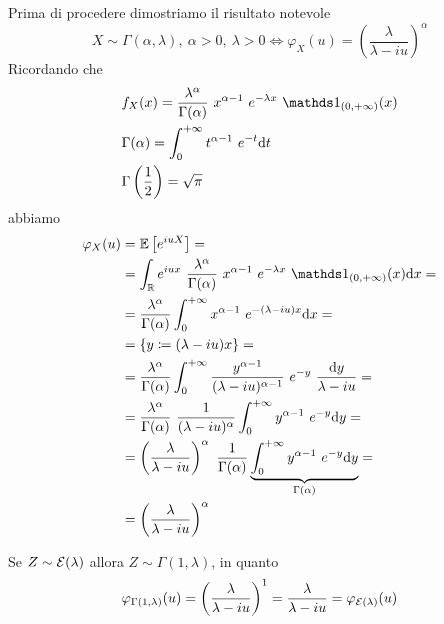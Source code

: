 \Soluzione{} %
Prima di procedere dimostriamo il risultato notevole
\[
X\sim\Gamma(\alpha,\lambda),\ \alpha>0,\ \lambda>0\iff\varphi_X(u)=\left(\frac{\lambda}{\lambda-iu} \right)^\alpha
\]
Ricordando che
\begin{gather*}
\begin{aligned}
&f_X(x)=\frac{\lambda^\alpha}{\Gamma(\alpha)}\ x^{\alpha-1}\ e^{-\lambda x}\ \Ind_{(0,+\infty)}(x) \\
&\Gamma(\alpha)=\int_{0}^{+\infty} t^{\alpha-1}\ e^{-t}\dt \\
&\Gamma\left(\frac{1}{2}\right)=\sqrt{\pi}
\end{aligned}
\end{gather*}
abbiamo
\begin{gather*}
\begin{aligned}
\varphi_X(u)&=\EE\left[e^{iuX}  \right]=\\
&=\int_\RR e^{iux}\ \frac{\lambda^\alpha}{\Gamma(\alpha)}\ x^{\alpha-1}\ e^{-\lambda x}\ \Ind_{(0,+\infty)}(x)\dx=\\
&=\frac{\lambda^\alpha}{\Gamma(\alpha)}\int_{0}^{+\infty} x^{\alpha-1}\ e^{-(\lambda-iu) x}\dx=\\
&=\{ y\coloneqq(\lambda-iu)x \}=\\
&=\frac{\lambda^\alpha}{\Gamma(\alpha)}\int_{0}^{+\infty} \frac{y^{\alpha-1}}{(\lambda-iu)^{\alpha-1}}\ e^{-y}\ \frac{\dy}{\lambda-iu}=\\
&=\frac{\lambda^\alpha}{\Gamma(\alpha)}\ \frac{1}{(\lambda-iu)^{\alpha}}\int_{0}^{+\infty} y^{\alpha-1}\ e^{-y}\dy =\\
&=\left(\frac{\lambda}{\lambda-iu}\right)^\alpha\ \frac{1}{\Gamma(\alpha)}\underbrace{\int_{0}^{+\infty} y^{\alpha-1}\ e^{-y}\dy}_{\Gamma(\alpha)}=\\
&=\left(\frac{\lambda}{\lambda-iu}\right)^\alpha
\end{aligned}
\end{gather*}
\begin{oss}
Se $Z\sim\mathcal{E}(\lambda)$ allora $Z\sim\Gamma(1,\lambda)$, in quanto
\[
\varphi_{\Gamma(1,\lambda)}(u)=\left(\frac{\lambda}{\lambda-iu}\right)^1=\frac{\lambda}{\lambda-iu}=\varphi_{\mathcal{E}(\lambda)}(u)
\]
\end{oss}
